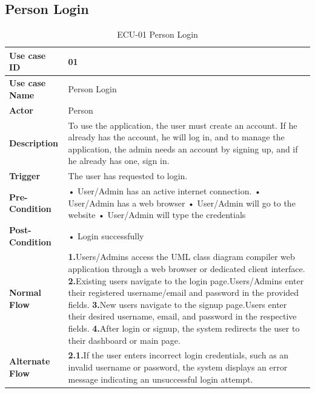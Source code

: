 \documentclass[12pt,a4paper]{article}
\begin{document}
\subsection{Person Login}
\begin{table}[h!]
\caption{ECU-01 Person Login}
    \centering
    \begin{tabular}{|l|p{10cm}|}
    \hline
       \textbf{Use case ID}&01 \\ %
       \hline
       \textbf{Use case Name}&Person Login\\ %
       \hline
       \textbf{Actor}&Person \\ %
       \hline
       \textbf{Description}&To use the application, the user must create an account. If he already has the account, he will log in, and to manage the application, the admin needs an account by signing up, and if he already has one, sign in. \\ %
       \hline
       \textbf{Trigger}&The user has requested to login. \\ %
        \hline
       \textbf{Pre-Condition}&
   \newline • User/Admin has an active internet connection.
   \newline • User/Admin has a web browser
   \newline • User/Admin will go to the website
   \newline • User/Admin will type the credentials
\\ %
        \hline
       \textbf{Post-Condition}&• Login successfully \\ %
        \hline
       \textbf{Normal Flow}&
    \textbf{1.}Users/Admins access the UML class diagram compiler web application through a web browser or dedicated client interface.
\newline  \textbf{2.}Existing users navigate to the login page.Users/Admins enter their registered username/email and password in the provided fields.
\newline \textbf{3.}New users navigate to the signup page.Users enter their desired username, email, and password in the respective fields.
 \newline \textbf{4.}After login or signup, the system redirects the user to their dashboard or main page.\\ %
\hline
       \textbf{Alternate Flow}&
       \textbf{2.1.}If the user enters incorrect login credentials, such as an invalid username or password, the system displays an error message indicating an unsuccessful login attempt.

\end{tabular}
\end{table}
\end{document}
